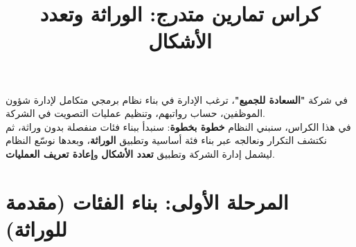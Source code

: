 \documentclass[14pt]{extarticle}
\title{كراس تمارين متدرج: الوراثة وتعدد الأشكال}
\begin{document}
\maketitle
\thispagestyle{fancy}

\begin{boxDef}
في شركة \textbf{"السعادة للجميع"}، ترغب الإدارة في بناء نظام برمجي متكامل لإدارة شؤون الموظفين، حساب رواتبهم، وتنظيم عمليات التصويت في الشركة. \\
في هذا الكراس، سنبني النظام \textbf{خطوة بخطوة}: سنبدأ ببناء فئات منفصلة بدون وراثة، ثم نكتشف التكرار ونعالجه عبر بناء فئة أساسية وتطبيق \textbf{الوراثة}، وبعدها نوسّع النظام ليشمل إدارة الشركة وتطبيق \textbf{تعدد الأشكال} و\textbf{إعادة تعريف العمليات}.
\end{boxDef}

\section*{المرحلة الأولى: بناء الفئات (مقدمة للوراثة)}
\end{document}
